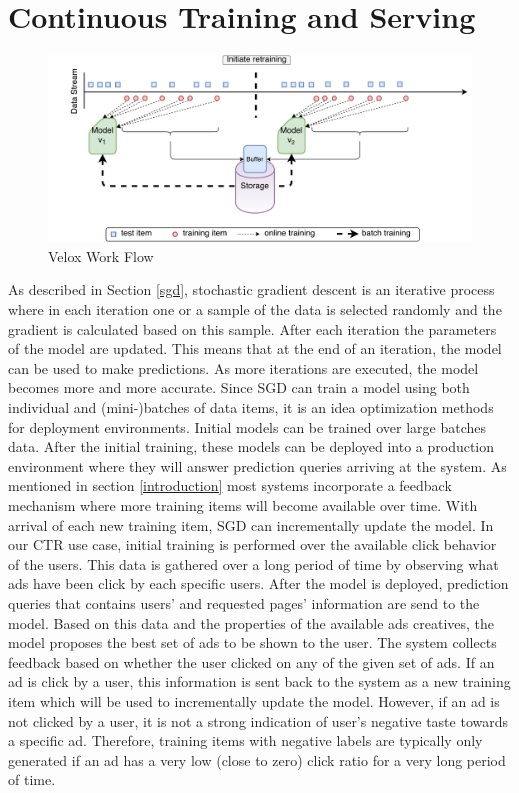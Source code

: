 \documentclass{vldb}
\begin{document}
\section{Continuous Training and Serving} \label{continious-training-serving}
\begin{figure}[!t]
\centering
\includegraphics[scale = 0.5]{../images/velox-1.pdf}
\caption{Velox Work Flow}
\label{fig:velox-work-flow}
\end{figure}
As described in Section \ref{sgd}, stochastic gradient descent is an iterative process where in each iteration one or a sample of the data is selected randomly and the gradient is calculated based on this sample. 
After each iteration the parameters of the model are updated.
This means that at the end of an iteration, the model can be used to make predictions.
As more iterations are executed, the model becomes more and more accurate.
Since SGD can train a model using both individual and (mini-)batches of data items, it is an idea optimization methods for deployment environments.
Initial models can be trained over large batches data.
After the initial training, these models can be deployed into a production environment where they will answer prediction queries arriving at the system.
As mentioned in section \ref{introduction} most systems incorporate a feedback mechanism where more training items will become available over time.
With arrival of each new training item, SGD can incrementally update the model.
In our CTR use case, initial training is performed over the available click behavior of the users.
This data is gathered over a long period of time by observing what ads have been click by each specific users.
After the model is deployed, prediction queries that contains users' and requested pages' information are send to the model.
Based on this data and the properties of the available ads creatives, the model proposes the best set of ads to be shown to the user.
The system collects feedback based on whether the user clicked on any of the given set of ads.
If an ad is click by a user, this information is sent back to the system as a new training item which will be used to incrementally update the model.
However, if an ad is not clicked by a user, it is not a strong indication of user's negative taste towards a specific ad.
Therefore, training items with negative labels are typically only generated if an ad has a very low (close to zero) click ratio for a very long period of time.
\end{document}

